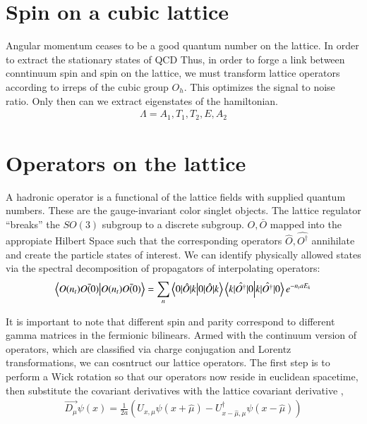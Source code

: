 \section{Spin on a cubic lattice}
Angular momentum ceases to be a good quantum number on the lattice. In order to extract the stationary states of QCD   Thus, in order to forge a link between conntinuum spin and spin on the lattice, we must transform lattice operators according to irreps of the cubic group $O_h$. This optimizes the signal to noise ratio. Only then can we extract eigenstates of the hamiltonian. 
\begin{align}
    \Lambda = {A_1,T_1,T_2,E,A_2}
\end{align}

\section{Operators on the lattice}
A hadronic operator is a functional of the lattice fields with supplied quantum numbers. These are the gauge-invariant color singlet objects. The lattice regulator ``breaks'' the $SO(3)$ subgroup to a discrete subgroup. $O,\bar{O}$ mapped into the appropiate Hilbert Space such that the corresponding operators $\hat{O} ,\hat{O^\dagger}$  annihilate and create the particle states of interest. We can identify physically allowed states via the spectral decomposition of propagators of interpolating operators: 
\begin{equation}
\braket{O(n_t)\bar{O(0)}} = \sum_{n}\braket{0|\hat{O}|k} \braket{k|\hat{O^{\dagger}}|0} e^{-n_taE_k}
\end{equation}

It is important to note that different spin and parity correspond to different gamma matrices in the fermionic bilinears. Armed with the continuum version of operators, which are classified via charge conjugation and Lorentz transformations, we can cosntruct our lattice operators. The first step is to perform a Wick rotation so that our operators now reside in euclidean spacetime, then substitute the covariant derivatives with the lattice covariant derivative \cite{G_ckeler_1996}, 
\begin{align}
    \overrightarrow{D_\mu}\psi(x) = \frac{1}{2a}(U_{x,\mu}\psi(x + \hat{\mu}) - U_{x-\hat{\mu},\mu}^\dagger\psi(x - \hat{\mu}))
\end{align}


